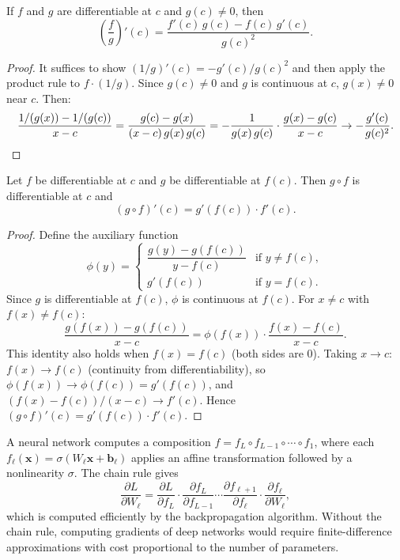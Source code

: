 \documentclass[11pt,a4paper]{article}
\begin{document}
\begin{theorem}
\label{thm:quotient_rule}
If $f$ and $g$ are differentiable at $c$ and $g(c) \neq 0$, then
\[
  \left(\frac{f}{g}\right)'(c)
  = \frac{f'(c)\,g(c) - f(c)\,g'(c)}{g(c)^2}.
\]
\end{theorem}

\begin{proof}
It suffices to show $(1/g)'(c) = -g'(c)/g(c)^2$ and then apply the
product rule to $f \cdot (1/g)$.  Since $g(c) \neq 0$ and $g$ is
continuous at $c$, $g(x) \neq 0$ near $c$.  Then:
\[
  \frac{1/(g(x)) - 1/(g(c))}{x - c}
  = \frac{g(c) - g(x)}{(x - c)\,g(x)\,g(c)}
  = -\frac{1}{g(x)\,g(c)} \cdot \frac{g(x) - g(c)}{x - c}
  \to -\frac{g'(c)}{g(c)^2}. \qedhere
\]
\end{proof}

\begin{theorem}
\label{thm:chain_rule}
Let $f$ be differentiable at $c$ and $g$ be differentiable at $f(c)$.
Then $g \circ f$ is differentiable at $c$ and
\[
  (g \circ f)'(c) = g'(f(c)) \cdot f'(c).
\]
\end{theorem}

\begin{proof}
Define the auxiliary function
\[
  \phi(y) = \begin{cases}
    \dfrac{g(y) - g(f(c))}{y - f(c)} & \text{if } y \neq f(c), \\[6pt]
    g'(f(c)) & \text{if } y = f(c).
  \end{cases}
\]
Since $g$ is differentiable at $f(c)$, $\phi$ is continuous at $f(c)$.
For $x \neq c$ with $f(x) \neq f(c)$:
\[
  \frac{g(f(x)) - g(f(c))}{x - c}
  = \phi(f(x)) \cdot \frac{f(x) - f(c)}{x - c}.
\]
This identity also holds when $f(x) = f(c)$ (both sides are $0$). Taking
$x \to c$: $f(x) \to f(c)$ (continuity from differentiability), so
$\phi(f(x)) \to \phi(f(c)) = g'(f(c))$, and
$(f(x) - f(c))/(x - c) \to f'(c)$. Hence
$(g \circ f)'(c) = g'(f(c)) \cdot f'(c)$.
\end{proof}

\begin{rlconnection}[title={The chain rule as the backbone of backpropagation}]
A neural network computes a composition $f = f_L \circ f_{L-1} \circ
\cdots \circ f_1$, where each $f_\ell(\mathbf{x}) = \sigma(W_\ell
\mathbf{x} + \mathbf{b}_\ell)$ applies an affine transformation followed
by a nonlinearity $\sigma$. The chain rule gives
\[
  \frac{\partial L}{\partial W_\ell}
  = \frac{\partial L}{\partial f_L} \cdot
    \frac{\partial f_L}{\partial f_{L-1}} \cdots
    \frac{\partial f_{\ell+1}}{\partial f_\ell} \cdot
    \frac{\partial f_\ell}{\partial W_\ell},
\]
which is computed efficiently by the backpropagation algorithm.  Without
the chain rule, computing gradients of deep networks would require
finite-difference approximations with cost proportional to the number of
parameters.
\end{rlconnection}
\end{document}

